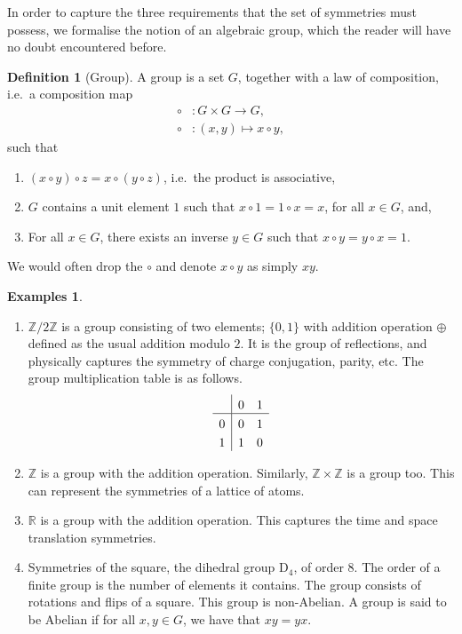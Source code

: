\documentclass[a4 paper, 12pt]{book}
\theoremstyle{definition}
\newtheorem{definition}{Definition}[section]
\newtheorem{examples}{Examples}[section]
\newcommand{\rr}{\mathbb{R}}
\newcommand{\zz}{\mathbb{Z}}
\begin{document}
	In order to capture the three requirements that the set of symmetries must possess, we formalise the notion of an algebraic group, which the reader will have no doubt encountered before.
	\begin{definition}[Group]
	    A group is a set \(G\), together with a law of composition, i.e.\ a composition map
		\begin{align*}
		    \circ &\colon G \times G \rightarrow G,\\
			\circ &\colon (x, y) \mapsto x \circ y,
		\end{align*}
		such that
		\begin{enumerate}
		    \item \((x\circ y) \circ z = x\circ (y \circ z)\), i.e.\ the product is associative,
			\item \(G\) contains a unit element \(1\) such that \(x \circ 1 = 1 \circ x = x\), for all \(x \in G\), and,
			\item For all \(x\in G\), there exists an inverse \(y \in G\) such that \(x \circ y = y \circ x = 1\).
		\end{enumerate}
	\end{definition}
	\noindent We would often drop the \(\circ\) and denote \(x\circ y\) as simply \(xy\).
	\begin{examples}
		\leavevmode \vspace{-\baselineskip}\vspace{12pt}
		\begin{enumerate}[label={(\alph*)},ref={\alph*}]
			\item \(\zz / 2\zz\) is a group consisting of two elements; \(\{0, 1\}\) with addition operation \(\oplus\) defined as the usual addition modulo \(2\). It is the group of reflections, and physically captures the symmetry of charge conjugation, parity, etc.
			The group multiplication table is as follows.
			\begin{align*}
				\setlength{\extrarowheight}{3pt}%
				\begin{array}{l|*{5}{l}}
						& 0   & 1\\
					\hline
					0   & 0   & 1\\
					1   & 1   & 0\\
				\end{array}
			\end{align*}
			\item \(\zz\) is a group with the addition operation. Similarly, \(\zz \times \zz\) is a group too. This can represent the symmetries of a lattice of atoms.
			\item \(\rr\) is a group with the addition operation. This captures the time and space translation symmetries.
			\item Symmetries of the square, the dihedral group \(\mathrm{D}_4\), of order \(8\). The order of a finite group is the number of elements it contains. The group consists of rotations and flips of a square. This group is non-Abelian. A group is said to be Abelian if for all \(x, y \in G\), we have that \(xy = yx\).
		\end{enumerate}
	\end{examples}

	\nocite{*}
	\printbibliography[heading=bibintoc]
	\printindex
\end{document}
